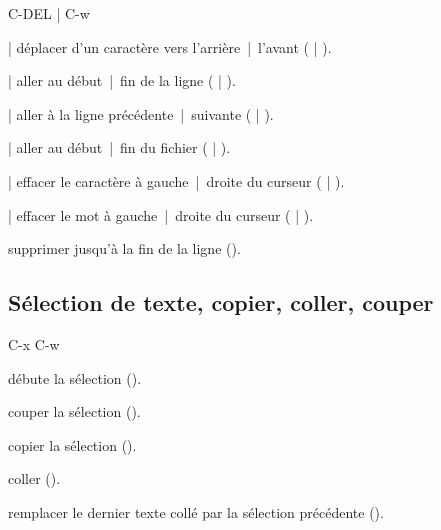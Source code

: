 \begin{ttscript}{C-DEL | C-w}
\item[\code{C-b} | \code{C-f}] déplacer d'un caractère vers
  l'arrière~|~l'avant \newline
  ( | ).
\item[\code{C-a} | \code{C-e}] aller au début~|~fin de la ligne \newline
  ( | ).
\item[\code{C-p} | \code{C-n}] aller à la ligne précédente~|~suivante \newline
  ( | ).
\item[\code{M-<} | \code{M->}] aller au début~|~fin du fichier \newline
  ( | ).
  \\
\item[\code{DEL} | \code{C-d}] effacer le caractère à
  gauche~|~droite du curseur  \newline
  ( | ).
\item[\code{M-DEL} | \code{M-d}] effacer le mot à gauche~|~droite
  du curseur  \newline
  ( | ).
\item[\code{C-k}] supprimer jusqu'à la fin de la ligne ().
\end{ttscript}



\subsection{Sélection de texte, copier, coller, couper}
\label{sec:emacs+ess:commandes:selection}

\begin{ttscript}{C-x C-w}
\item[\code{C-SPC}] débute la sélection ().
\item[\code{C-w}] couper la sélection ().
\item[\code{M-w}] copier la sélection ().
\item[\code{C-y}] coller ().
\item[\code{M-y}] remplacer le dernier texte collé par la
  sélection précédente \newline
  ().
\end{ttscript}

